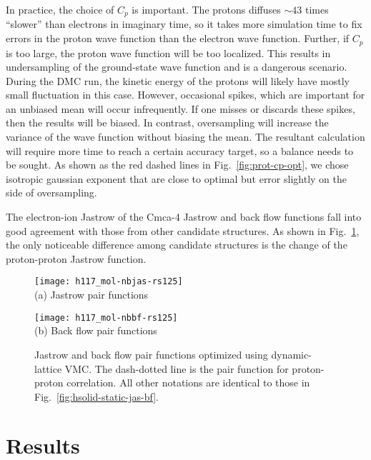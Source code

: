 In practice, the choice of $C_p$ is important.
The protons diffuses $\sim 43$ times ``slower'' than electrons in imaginary time, so it takes more simulation time to fix errors in the proton wave function than the electron wave function.
Further, if $C_p$ is too large, the proton wave function will be too localized.
This results in undersampling of the ground-state wave function and is a dangerous scenario.
During the DMC run, the kinetic energy of the protons will likely have mostly small fluctuation in this case.
However, occasional spikes, which are important for an unbiased mean will occur infrequently.
If one misses or discards these spikes, then the results will be biased.
In contrast, oversampling will increase the variance of the wave function without biasing the mean.
The resultant calculation will require more time to reach a certain accuracy target, so a balance needs to be sought.
As shown as the red dashed lines in Fig.~\ref{fig:prot-cp-opt}, we chose isotropic gaussian exponent that are close to optimal but error slightly on the side of oversampling.

The electron-ion Jastrow of the Cmca-4 Jastrow and back flow functions fall into good agreement with those from other candidate structures. As shown in Fig.~\ref{fig:hsolid-dynamic-jas-bf}, the only noticeable difference among candidate structures is the change of the proton-proton Jastrow function.

\begin{figure}[h]
\centering
\begin{minipage}{0.49\textwidth}
\centering
\texttt{[image: h117\_mol-nbjas-rs125]}\\
(a) Jastrow pair functions
\end{minipage}
\begin{minipage}{0.49\textwidth}
\centering
\texttt{[image: h117\_mol-nbbf-rs125]}\\
(b) Back flow pair functions
\end{minipage}
\caption{Jastrow and back flow pair functions optimized using dynamic-lattice VMC. The dash-dotted line is the pair function for proton-proton correlation. All other notations are identical to those in Fig.~\ref{fig:hsolid-static-jas-bf}.}
\label{fig:hsolid-dynamic-jas-bf}
\end{figure}

\section{Results}
\label{sec:hsolid-results}


